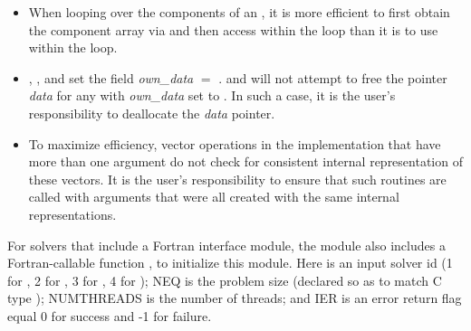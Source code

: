 \begin{itemize}
                                        
\item
  When looping over the components of an  , it is     
  more efficient to first obtain the component array via       
   and then access  within the     
  loop than it is to use  within the loop.        

\item
  {\warn}, , 
  and  set the field 
  {\em own\_data} $=$ . 
   and 
  will not attempt to free the pointer {\em data} for any  with
  {\em own\_data} set to . In such a case, it is the user's responsibility to
  deallocate the {\em data} pointer.
                                     
\item
  {\warn}To maximize efficiency, vector operations in the {\nvecopenmp} implementation
  that have more than one  argument do not check for
  consistent internal representation of these vectors. It is the user's 
  responsibility to ensure that such routines are called with 
  arguments that were all created with the same internal representations.

\end{itemize}

For solvers that include a Fortran interface module, the {\nvecopenmp}
module also includes a Fortran-callable function
, to initialize this
module.  Here  is an input solver id
(1 for {\cvode}, 2 for {\ida}, 3 for {\kinsol}, 4 for {\arkode}); NEQ is
the problem size (declared so as to match C type );
NUMTHREADS is the number of threads; and IER is an error return flag
equal 0 for success and -1 for failure.
